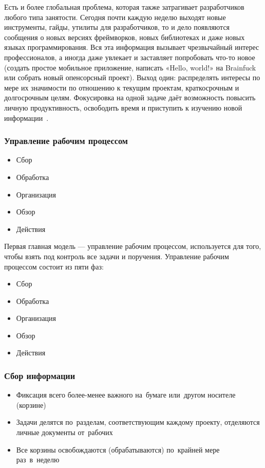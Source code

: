 \documentclass{../industrial-development}
\begin{document}
Есть и более глобальная проблема, которая также затрагивает разработчиков любого типа занятости. Сегодня почти каждую неделю выходят новые инструменты, гайды, утилиты для разработчиков, то и дело появляются сообщения о новых версиях фреймворков, новых библиотеках и даже новых языках программирования. Вся эта информация вызывает чрезвычайный интерес профессионалов, а иногда даже увлекает и заставляет попробовать что-то новое (создать простое мобильное приложение, написать «Hello, world!» на Brainfuck или собрать новый опенсорсный проект). Выход один: распределять интересы по мере их значимости по отношению к текущим проектам, краткосрочным и долгосрочным целям. Фокусировка на одной задаче даёт возможность повысить личную продуктивность, освободить время и приступить к изучению новой информации~\cite{GTDHabr}.

\begin{frame} \frametitle{Управление рабочим процессом}
  \begin{itemize}
  \item Сбор
  \item Обработка
  \item Организация
  \item Обзор
  \item Действия
  \end{itemize}
\end{frame}

\lecturenotes

Первая главная модель — управление рабочим процессом, используется для того, чтобы взять под контроль все задачи и поручения. Управление рабочим процессом состоит из пяти фаз:
\begin{itemize}
\item Сбор
\item Обработка
\item Организация
\item Обзор
\item Действия~\cite{GTDWikipedia}
\end{itemize}

\begin{frame} \frametitle{Сбор информации}
  \begin{itemize}
  \item Фиксация всего более-менее важного на~бумаге или~другом носителе (корзине)
  \item Задачи делятся по~разделам, соответствующим каждому проекту, отделяются личные документы от~рабочих
  \item Все корзины освобождаются (обрабатываются) по~крайней мере раз~в~неделю
  \end{itemize}
\end{frame}
\end{document}
